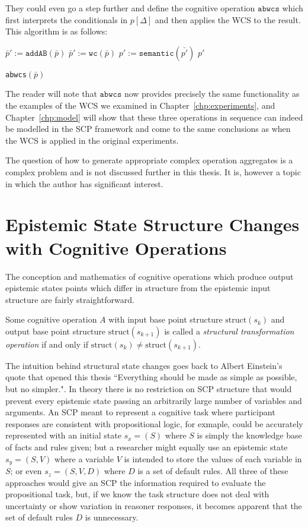 They could even go a step further and define the cognitive operation $\texttt{abwcs}$ which first interprets the conditionals in $p[\Delta]$ and then applies the WCS to the result. This algorithm is as follows:

\begin{algorithm}[H] \label{cogOp:abwcs}
\SetAlgoLined
{}
{
$\bar{p}':=\texttt{addAB}(\bar{p})$\;
$\bar{p}':=\texttt{wc}(\bar{p})$\;
$p':=\texttt{semantic}(\bar{p'})$\;
\Return $p'$
}

\caption{\texttt{abwcs}$(\bar{p})$}
\end{algorithm}

The reader will note that $\texttt{abwcs}$ now provides precisely the same functionality as the examples of the WCS we examined in Chapter~\ref{chp:experiments}, and Chapter~\ref{chp:model} will show that these three operations in sequence can indeed be modelled in the SCP framework and come to the same conclusions as when the WCS is applied in the original experiments.

The question of how to generate appropriate complex operation aggregates is a complex problem and is not discussed further in this thesis. It is, however a topic in which the author has significant interest.


\section{Epistemic State Structure Changes with Cognitive Operations}
The conception and mathematics of cognitive operations which produce output epistemic states points which differ in structure from the epistemic input structure are fairly straightforward.

Some cognitive operation $A$ with input base point structure $\textrm{struct}(s_k)$ and output base point structure $\textrm{struct}(s_{k+1})$ is called a \textit{structural transformation operation} if and only if $\textrm{struct}(s_k) \ne \textrm{struct}(s_{k+1})$.

The intuition behind structural state changes goes back to Albert Einstein's quote that opened this thesis ``Everything should be made as simple as possible, but no simpler.". In theory there is no restriction on SCP structure that would prevent every epistemic state passing an arbitrarily large number of variables and arguments. An SCP meant to represent a cognitive task where participant responses are consistent with propositional logic, for exmaple, could be accurately represented with an initial state $s_x=(S)$ where $S$ is simply the knowledge base of facts and rules given; but a researcher might equally use an epistemic state $s_y=(S,V)$ where a variable $V$ is intended to store the values of each variable in $S$; or even $s_z=(S,V,D)$ where $D$ is a set of default rules. All three of these approaches would give an SCP the information required to evaluate the propositional task, but, if we know the task structure does not deal with uncertainty or show variation in reasoner responses, it becomes apparent that the set of default rules $D$ is unnecessary.


